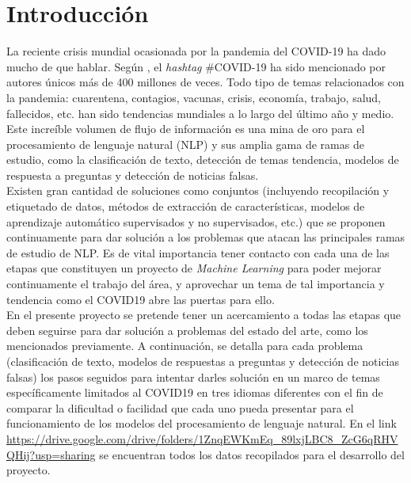 \section{Introducción}

La reciente crisis mundial ocasionada por la pandemia del COVID-19 ha dado mucho de que hablar. Según \cite{Twitter_blog}, el \textit{hashtag} \#COVID-19 ha sido mencionado por autores únicos más de 400 millones de veces. Todo tipo de temas relacionados con la pandemia: cuarentena, contagios, vacunas, crisis, economía, trabajo, salud, fallecidos, etc. han sido tendencias mundiales a lo largo del último año y medio. Este increíble volumen de flujo de información es una mina de oro para el procesamiento de lenguaje natural (NLP) y sus amplia gama de ramas de estudio, como la clasificación de texto, detección de temas tendencia, modelos de respuesta a preguntas y detección de noticias falsas.\\

Existen gran cantidad de soluciones como conjuntos (incluyendo recopilación y etiquetado de datos, métodos de extracción de características, modelos de aprendizaje automático supervisados y no supervisados, etc.) que se proponen continuamente para dar solución a los problemas que atacan las principales ramas de estudio de NLP. Es de vital importancia tener contacto con cada una de las etapas que constituyen un proyecto de \textit{Machine Learning} para poder mejorar continuamente el trabajo del área, y aprovechar un tema de tal importancia y tendencia como el COVID19 abre las puertas para ello.\\

En el presente proyecto se pretende tener un acercamiento a todas las etapas que deben seguirse para dar solución a problemas del estado del arte, como los mencionados previamente. A continuación, se detalla para cada problema (clasificación de texto, modelos de respuestas a preguntas y detección de noticias falsas) los pasos seguidos para intentar darles solución en un marco de temas específicamente limitados al COVID19 en tres idiomas diferentes con el fin de comparar la dificultad o facilidad que cada uno pueda presentar para el funcionamiento de los modelos del procesamiento de lenguaje natural. En el link \url{https://drive.google.com/drive/folders/1ZnqEWKmEq_89lxjLBC8_ZcG6qRHVQHij?usp=sharing} se encuentran todos los datos recopilados para el desarrollo del proyecto.

\newpage